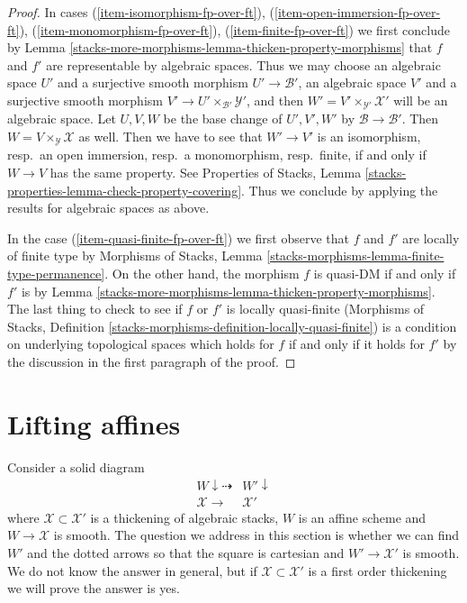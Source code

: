 \begin{proof}
\medskip\noindent
In cases (\ref{item-isomorphism-fp-over-ft}),
(\ref{item-open-immersion-fp-over-ft}),
(\ref{item-monomorphism-fp-over-ft}),
(\ref{item-finite-fp-over-ft})
we first conclude by Lemma \ref{stacks-more-morphisms-lemma-thicken-property-morphisms}
that $f$ and $f'$ are representable by algebraic spaces. Thus we may choose
an algebraic space $U'$ and a surjective smooth morphism
$U' \to \mathcal{B}'$,
an algebraic space $V'$ and a surjective smooth morphism
$V' \to U' \times_{\mathcal{B}'} \mathcal{Y}'$, and then
$W' = V' \times_{\mathcal{Y}'} \mathcal{X}'$ will be an algebraic space.
Let $U, V, W$ be the base change of
$U', V', W'$ by $\mathcal{B} \to \mathcal{B}'$.
Then $W = V \times_\mathcal{Y} \mathcal{X}$ as well.
Then we have to see that $W' \to V'$ is an
isomorphism, resp.\ an open immersion, resp.\ a monomorphism,
resp.\ finite, if and only if $W \to V$ has the same property.
See Properties of Stacks, Lemma
\ref{stacks-properties-lemma-check-property-covering}.
Thus we conclude by applying the results
for algebraic spaces as above.

\medskip\noindent
In the case (\ref{item-quasi-finite-fp-over-ft}) we first
observe that $f$ and $f'$ are locally of finite type by
Morphisms of Stacks, Lemma \ref{stacks-morphisms-lemma-finite-type-permanence}.
On the other hand, the morphism $f$ is quasi-DM if and only if
$f'$ is by
Lemma \ref{stacks-more-morphisms-lemma-thicken-property-morphisms}.
The last thing to check to see if $f$ or $f'$ is locally quasi-finite
(Morphisms of Stacks, Definition
\ref{stacks-morphisms-definition-locally-quasi-finite})
is a condition on underlying topological spaces
which holds for $f$ if and only if it holds for $f'$ by
the discussion in the first paragraph of the proof.
\end{proof}

\section{Lifting affines}
\label{stacks-more-morphisms-section-lifting-affines}
Consider a solid diagram
$$
\begin{array}{cc}W \downarrow\dashrightarrow & W' \downarrow \\ \mathcal{X} \longrightarrow & \mathcal{X}'\end{array}
$$
where $\mathcal{X} \subset \mathcal{X}'$ is a thickening of algebraic stacks,
$W$ is an affine scheme and $W \to \mathcal{X}$ is smooth. The question
we address in this section is whether we can find $W'$ and the dotted
arrows so that the square is cartesian and $W' \to \mathcal{X}'$ is smooth.
We do not know the answer in general, but if $\mathcal{X} \subset \mathcal{X}'$
is a first order thickening we will prove the answer is yes.

